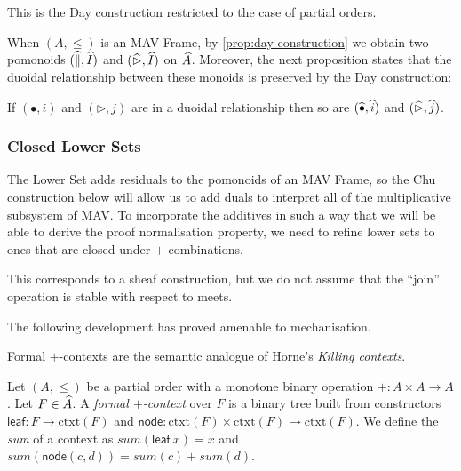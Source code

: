 \begin{remark}
  This is the Day construction \cite{day} restricted to the case of
  partial orders.
\end{remark}

\begin{remark}
  When $(A, \leq)$ is an MAV Frame, by \ref{prop:day-construction} we
  obtain two pomonoids $(\mathop{\widehat{\parallel}}, \mathop{\widehat{I}})$ and
  $(\mathop{\widehat{\rhd}}, \mathop{\widehat{I}})$ on $\widehat{A}$. Moreover, the next
  proposition states that the duoidal relationship between these
  monoids is preserved by the Day construction:
\end{remark}

\begin{proposition}\label{prop:lower-set-duoidal}
  If $(\bullet, i)$ and $(\rhd, j)$ are in a duoidal relationship then
  so are $(\mathop{\widehat{\bullet}}, \mathop{\widehat{i}})$ and $(\mathop{\widehat{\rhd}}, \mathop{\widehat{j}})$.
\end{proposition}

\subsubsection{Closed Lower Sets}

\newcommand{\ClosedLowerSet}[1]{\widehat{#1}^+}
\newcommand{\ClosedDay}[1]{\mathop{\widehat{#1}^+}}
\newcommand{\Chu}{\mathrm{Chu}}
\newcommand{\op}{\mathrm{op}}

The Lower Set adds residuals to the pomonoids of an MAV Frame, so the
Chu construction below will allow us to add duals to interpret all of
the multiplicative subsystem of MAV. To incorporate the additives in
such a way that we will be able to derive the proof normalisation
property, we need to refine lower sets to ones that are closed under
$+$-combinations.

This corresponds to a sheaf construction, but we do not assume that
the ``join'' operation is stable with respect to meets.

The following development has proved amenable to mechanisation.

Formal $+$-contexts are the semantic analogue of Horne's \emph{Killing
  contexts}.

\begin{definition}
  Let $(A, \leq)$ be a partial order with a monotone binary operation
  $+ : A \times A \to A$.  Let $F \in \widehat{A}$. A \emph{formal
    $+$-context} over $F$ is a binary tree built from constructors
  $\mathsf{leaf} : F \to \mathrm{ctxt}(F)$ and
  $\mathsf{node} : \mathrm{ctxt}(F) \times \mathrm{ctxt}(F) \to
  \mathrm{ctxt}(F)$. We define the \emph{sum} of a context as
  $\mathit{sum}(\mathsf{leaf}~x) = x$ and
  $\mathit{sum}(\mathsf{node}(c,d)) = \mathit{sum}(c) +
  \mathit{sum}(d)$.
\end{definition}

